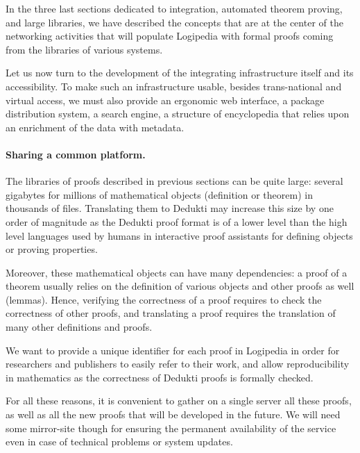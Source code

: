 
In the three last sections dedicated to integration, automated theorem
proving, and large libraries, we have described the concepts that are
at the center of the networking activities that will populate
Logipedia with formal proofs coming from the libraries of various
systems.

Let us now turn to the development of the integrating infrastructure
itself and its accessibility.
To make such an infrastructure
usable, besides trans-national and virtual access,
we must also provide an ergonomic web interface, a package
distribution system, a search engine, a structure of encyclopedia
that relies upon an enrichment of the data with metadata.

\paragraph*{Sharing a common platform.}

The libraries of proofs described in previous sections can be quite
large: several gigabytes for millions of mathematical objects
(definition or theorem) in thousands of files. Translating them to
Dedukti may increase this size by one order of magnitude as the
Dedukti proof format is of a lower level than the high level languages
used by humans in interactive proof assistants for defining objects or
proving properties.

Moreover, these mathematical objects can have many dependencies: a
proof of a theorem usually relies on the definition of various objects
and other proofs as well (lemmas). Hence, verifying the correctness of
a proof requires to check the correctness of other proofs, and
translating a proof requires the translation of many other definitions
and proofs.

We want to provide a unique identifier for each proof in
Logipedia in order for researchers and publishers to easily refer to
their work, and allow reproducibility in mathematics as the
correctness of Dedukti proofs is formally checked.

For all these reasons, it is convenient to gather on a single server
all these proofs, as well as all the new proofs that will be developed
in the future. We will need some mirror-site though for ensuring the
permanent availability of the service even in case of technical
problems or system updates.

